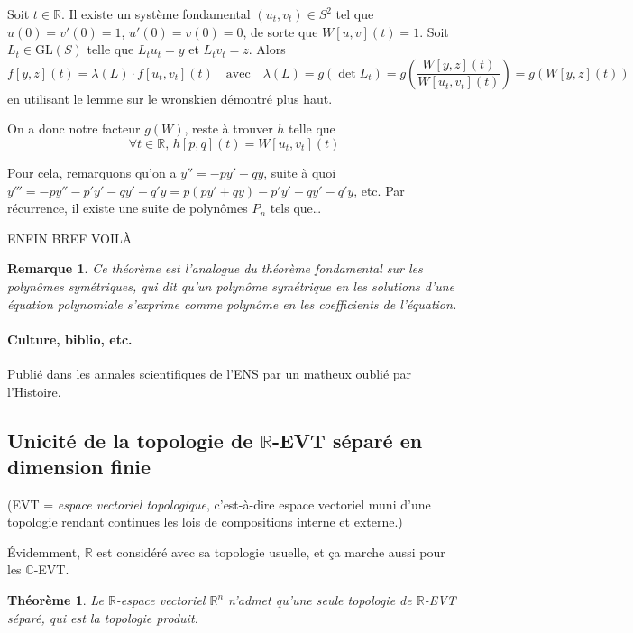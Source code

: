 \documentclass[a4paper, 11pt]{article}
\def\R{\mathbb{R}}
\def\C{\mathbb{C}}
\def\GL{\mathrm{GL}}
\newtheorem*{theorem}{Théorème}
\newtheorem*{remark}{Remarque}
\begin{document}
Soit $t \in \R$. Il existe un système fondamental $(u_t, v_t) \in S^2$ tel que
$u(0) = v'(0) = 1$, $u'(0) = v(0) = 0$, de sorte que $W[u,v](t) = 1$. Soit $L_t
\in \GL(S)$ telle que $L_tu_t = y$ et $L_tv_t = z$. Alors
\[ f[y,z](t) = \lambda(L) \cdot f[u_t,v_t](t) \quad \text{avec} \quad
  \lambda(L) = g(\det L_t) = g\left( \frac{W[y,z](t)}{W[u_t,v_t](t)} \right)
    = g(W[y,z](t))
\]
en utilisant le lemme sur le wronskien démontré plus haut.

On a donc notre facteur $g(W)$, reste à trouver $h$ telle que
\[ \forall t \in \R,\, h[p,q](t) = W[u_t, v_t](t) \]

Pour cela, remarquons qu'on a $y'' = -py' - qy$, suite à quoi $y''' = -py'' -
p'y' - qy' - q'y = p(py'+qy) - p'y' - qy' - q'y$, etc. Par récurrence, il existe
une suite de polynômes $P_n$ tels que…

ENFIN BREF VOILÀ

\begin{remark}
  Ce théorème est l'analogue du théorème fondamental sur les polynômes
  symétriques, qui dit qu'un polynôme symétrique en les solutions d'une équation
  polynomiale s'exprime comme polynôme en les coefficients de l'équation.
\end{remark}

\paragraph{Culture, biblio, etc.}

Publié dans les annales scientifiques de l'ENS par un matheux oublié par
l'Histoire. 

\newpage

\subsection{Unicité de la topologie de $\R$-EVT séparé en dimension finie}

(EVT = \emph{espace vectoriel topologique}, c'est-à-dire espace vectoriel muni
d'une topologie rendant continues les lois de compositions interne et externe.)

Évidemment, $\R$ est considéré avec sa topologie usuelle, et ça marche aussi
pour les $\C$-EVT.

\begin{theorem}
  Le $\R$-espace vectoriel $\R^n$ n'admet qu'une seule topologie de $\R$-EVT
  séparé, qui est la topologie produit.
\end{theorem}
\end{document}
